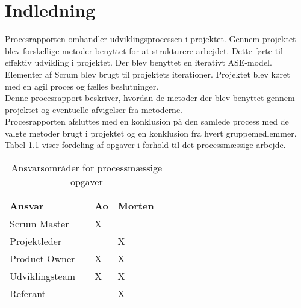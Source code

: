 \chapter{Indledning}
Procesrapporten omhandler udviklingsprocessen i projektet. Gennem projektet blev
forskellige metoder benyttet for at strukturere arbejdet. Dette førte til effektiv
udvikling i projektet.
Der blev benyttet en iterativt ASE-model. Elementer af Scrum blev brugt til
projektets iterationer. Projektet blev køret med en agil proces og fælles beslutninger. \\
Denne procesrapport beskriver, hvordan de metoder der blev benyttet gennem
projektet og eventuelle afvigelser fra metoderne. \\ 
Procesrapporten afsluttes med en konklusion på den samlede process med de valgte metoder brugt i projektet og en konklusion fra hvert gruppemedlemmer. \\
Tabel \ref{ProcessTabel} viser fordeling af opgaver i forhold til det processmæssige arbejde.

\begin{table}[H]
	\centering
	\begin{tabular}{lllll} \hline
		\textbf{Ansvar} &  & \textbf{Ao}&  \textbf{Morten}&  \\ \hline
		Scrum Master&  &  X&  &  \\ \hline
		Projektleder&  &  &  X&  \\ \hline
		Product Owner&  &  X&  X& \\ \hline
		Udviklingsteam& & X& X& \\  \hline
		Referant& & & X& \\ \hline
	\end{tabular}
	\caption{Ansvarsområder for processmæssige opgaver}
	\label{ProcessTabel}
\end{table}